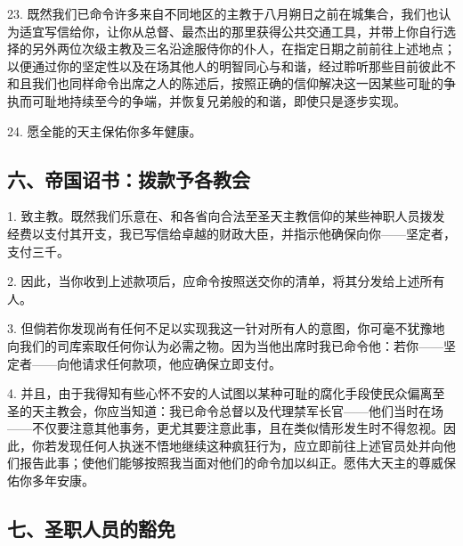 23. 既然我们已命令许多来自不同地区的主教于八月朔日之前在城集合，我们也认为适宜写信给你，让你从总督、最杰出的那里获得公共交通工具，并带上你自行选择的另外两位次级主教及三名沿途服侍你的仆人，在指定日期之前前往上述地点；以便通过你的坚定性以及在场其他人的明智同心与和谐，经过聆听那些目前彼此不和且我们也同样命令出席之人的陈述后，按照正确的信仰解决这一因某些可耻的争执而可耻地持续至今的争端，并恢复兄弟般的和谐，即使只是逐步实现。\par

24. 愿全能的天主保佑你多年健康。\par


\subsection{六、帝国诏书：拨款予各教会}

1. 致主教。既然我们乐意在、和各省向合法至圣天主教信仰的某些神职人员拨发经费以支付其开支，我已写信给卓越的财政大臣，并指示他确保向你——坚定者，支付三千。\par

2. 因此，当你收到上述款项后，应命令按照送交你的清单，将其分发给上述所有人。\par

3. 但倘若你发现尚有任何不足以实现我这一针对所有人的意图，你可毫不犹豫地向我们的司库索取任何你认为必需之物。因为当他出席时我已命令他：若你——坚定者——向他请求任何款项，他应确保立即支付。\par

4. 并且，由于我得知有些心怀不安的人试图以某种可耻的腐化手段使民众偏离至圣的天主教会，你应当知道：我已命令总督以及代理禁军长官——他们当时在场——不仅要注意其他事务，更尤其要注意此事，且在类似情形发生时不得忽视。因此，你若发现任何人执迷不悟地继续这种疯狂行为，应立即前往上述官员处并向他们报告此事；使他们能够按照我当面对他们的命令加以纠正。愿伟大天主的尊威保佑你多年安康。\par


\subsection{七、圣职人员的豁免}

